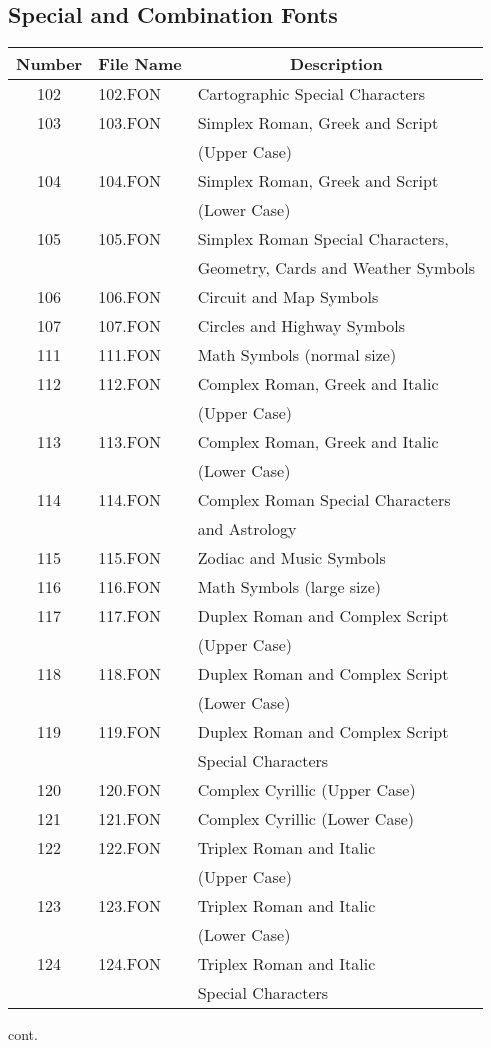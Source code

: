 \subsection{Special and Combination Fonts}
\begin{tabular}{|c|l|l|}
\hline
\multicolumn{1}{|c|}{Number}
&\multicolumn{1}{|c|}{File Name}
&\multicolumn{1}{|c|}{Description}\\
\hline
102 & 102.FON & Cartographic Special Characters\\
103 & 103.FON & Simplex Roman, Greek and Script\\
& & (Upper Case)\\
104 & 104.FON & Simplex Roman, Greek and Script\\
& & (Lower Case)\\
105 & 105.FON & Simplex Roman Special Characters,\\
& & Geometry, Cards and Weather Symbols\\
106 & 106.FON & Circuit and Map Symbols\\
107 & 107.FON & Circles and Highway Symbols\\
111 & 111.FON & Math Symbols (normal size)\\
112 & 112.FON & Complex Roman, Greek and Italic\\
& & (Upper Case)\\
113 & 113.FON & Complex Roman, Greek and Italic\\
& & (Lower Case)\\
114 & 114.FON & Complex Roman Special Characters\\
& & and Astrology\\
115 & 115.FON & Zodiac and Music Symbols\\
116 & 116.FON & Math Symbols (large size)\\
117 & 117.FON & Duplex Roman and Complex Script\\
& & (Upper Case)\\
118 & 118.FON & Duplex Roman and Complex Script\\
& & (Lower Case)\\
119 & 119.FON & Duplex Roman and Complex Script\\
& & Special Characters\\
120 & 120.FON & Complex Cyrillic (Upper Case)\\
121 & 121.FON & Complex Cyrillic (Lower Case)\\
122 & 122.FON & Triplex Roman and Italic\\
& & (Upper Case)\\
123 & 123.FON & Triplex Roman and Italic\\
& & (Lower Case)\\
124 & 124.FON & Triplex Roman and Italic\\
& & Special Characters\\ \hline
\end{tabular}
\newpage
cont.

